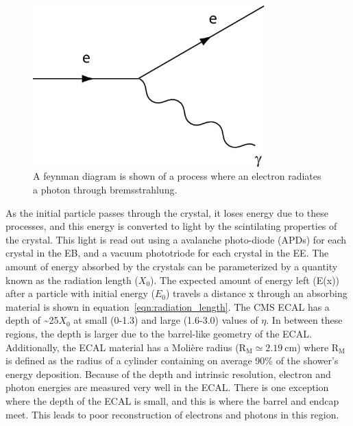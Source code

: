 \begin{figure}[!ht]
\begin{center}
\includegraphics[width=0.8\textwidth]{cms/figs/photon_brem.png}
\caption{
  A feynman diagram is shown of a process where an electron radiates a photon through bremsstrahlung.
\label{fig:photon_brem}
}
\end{center}
\end{figure}

As the initial particle passes through the crystal, it loses energy due to these processes, and this energy is converted to light by the scintilating properties of the crystal.
This light is read out using a avalanche photo-diode (APDs) for each crystal in the EB, and a vacuum phototriode for each crystal in the EE.
The amount of energy absorbed by the crystals can be parameterized by a quantity known as the radiation length ($X_{0}$).
The expected amount of energy left (E(x)) after a particle with initial energy ($E_{0}$)
travels a distance x through an absorbing material is shown in equation~\ref{eqn:radiation_length}.
The CMS ECAL has a depth of \textasciitilde{}25$X_{0}$ at small (0-1.3) and large (1.6-3.0) values of $\eta$.
In between these regions, the depth is larger due to the barrel-like geometry of the ECAL.
Additionally, the ECAL material has a Moli\`ere radius ($\mathrm{R_{M} \simeq 2.19~cm}$) where
$\mathrm{R_{M}}$ is defined as the radius of a cylinder containing on average 90\% of the shower's energy deposition.
Because of the depth and intrinsic resolution, electron and photon energies are measured very well in the ECAL.
There is one exception where the depth of the ECAL is small, and this is where the barrel and endcap meet.
This leads to poor reconstruction of electrons and photons in this region.

